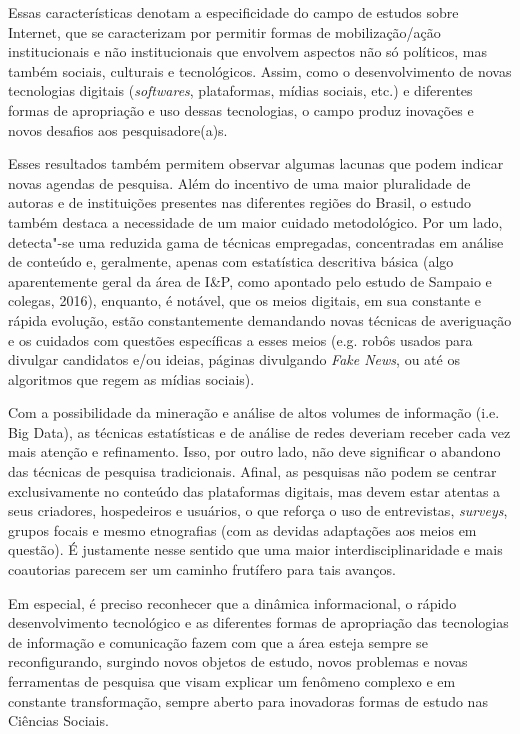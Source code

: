 Essas características denotam a especificidade do campo de estudos sobre
Internet, que se caracterizam por permitir formas de mobilização/ação
institucionais e não institucionais que envolvem aspectos não só
políticos, mas também sociais, culturais e tecnológicos. Assim, como o
desenvolvimento de novas tecnologias digitais (\emph{softwares},
plataformas, mídias sociais, etc.) e diferentes formas de apropriação e
uso dessas tecnologias, o campo produz inovações e novos desafios aos
pesquisadore(a)s.

Esses resultados também permitem observar algumas lacunas que podem
indicar novas agendas de pesquisa. Além do incentivo de uma maior
pluralidade de autoras e de instituições presentes nas diferentes
regiões do Brasil, o estudo também destaca a necessidade de um maior
cuidado metodológico. Por um lado, detecta"-se uma reduzida gama de
técnicas empregadas, concentradas em análise de conteúdo e, geralmente,
apenas com estatística descritiva básica (algo aparentemente geral da
área de I\&P, como apontado pelo estudo de Sampaio e colegas, 2016),
enquanto, é notável, que os meios digitais, em sua constante e rápida
evolução, estão constantemente demandando novas técnicas de averiguação
e os cuidados com questões específicas a esses meios (e.g. robôs usados
para divulgar candidatos e/ou ideias, páginas divulgando \emph{Fake
News}, ou até os algoritmos que regem as mídias sociais).

Com a possibilidade da mineração e análise de altos volumes de
informação (i.e. Big Data), as técnicas estatísticas e de análise de
redes deveriam receber cada vez mais atenção e refinamento. Isso, por
outro lado, não deve significar o abandono das técnicas de pesquisa
tradicionais. Afinal, as pesquisas não podem se centrar exclusivamente
no conteúdo das plataformas digitais, mas devem estar atentas a seus
criadores, hospedeiros e usuários, o que reforça o uso de entrevistas,
\emph{surveys}, grupos focais e mesmo etnografias (com as devidas
adaptações aos meios em questão). É justamente nesse sentido que uma
maior interdisciplinaridade e mais coautorias parecem ser um caminho
frutífero para tais avanços.

Em especial, é preciso reconhecer que a dinâmica informacional, o rápido
desenvolvimento tecnológico e as diferentes formas de apropriação das
tecnologias de informação e comunicação fazem com que a área esteja
sempre se reconfigurando, surgindo novos objetos de estudo, novos
problemas e novas ferramentas de pesquisa que visam explicar um fenômeno
complexo e em constante transformação, sempre aberto para inovadoras
formas de estudo nas Ciências Sociais.

